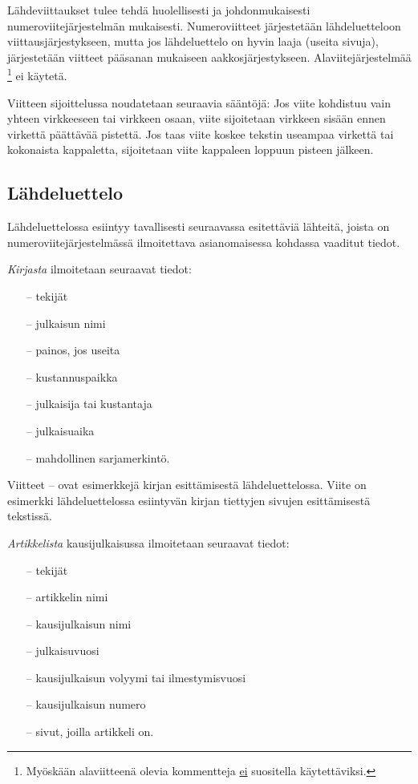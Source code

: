 \documentclass[english,12pt,a4paper,pdftex,elec,utf8]{aaltothesis}
\begin{document}
L\"ahdeviittaukset tulee tehd\"a huolellisesti ja johdonmukaisesti
numeroviitej\"arjestelm\"an mukaisesti. Numeroviitteet j\"arjestet\"a\"an
l\"ahdeluetteloon viittausj\"arjestykseen, mutta jos l\"ahdeluettelo
on hyvin laaja (useita sivuja), j\"arjestet\"a\"an viitteet p\"a\"asanan
mukaiseen aakkosj\"arjestykseen. Alaviitej\"arjestelm\"a\"a
\footnote{My\"osk\"a\"an alaviitteen\"a olevia kommentteja \underline{ei} suositella
k\"aytett\"aviksi.} ei k\"aytet\"a.

Viitteen sijoittelussa noudatetaan seuraavia s\"a\"ant\"oj\"a:
Jos viite kohdistuu vain yhteen virkkeeseen tai virkkeen
osaan, viite \cite{Kauranen} sijoitetaan virkkeen sis\"a\"an ennen virkett\"a
p\"a\"att\"av\"a\"a pistett\"a. Jos taas viite koskee tekstin useampaa
virkett\"a tai kokonaista kappaletta, sijoitetaan viite kappaleen loppuun
pisteen j\"alkeen. \cite{Kauranen}

\subsection*{L\"ahdeluettelo}

L\"ahdeluettelossa esiintyy tavallisesti seuraavassa esitett\"avi\"a
l\"ahteit\"a, joista on numeroviitej\"arjestelm\"ass\"a ilmoitettava
asianomaisessa kohdassa vaaditut tiedot.

\textit{Kirjasta} ilmoitetaan seuraavat tiedot:

\begin{itemize}
\item[--]tekij\"at
\item[--]julkaisun nimi
\item[--]painos, jos useita
\item[--]kustannuspaikka
\item[--]julkaisija tai kustantaja
\item[--]julkaisuaika
\item[--]mahdollinen sarjamerkint\"o.
\end{itemize}

Viitteet \cite{Kauranen}--\cite{Koblitz} ovat esimerkkej\"a kirjan
esitt\"amisest\"a l\"ahdeluettelossa. Viite \cite[s.\ 83--124]{Koblitz} on
esimerkki l\"ahdeluettelossa esiintyv\"an kirjan tiettyjen sivujen
esitt\"amisest\"a tekstiss\"a.

\textit{Artikkelista} kausijulkaisussa ilmoitetaan seuraavat tiedot:

\begin{itemize}

\item[--]tekij\"at
\item[--]artikkelin nimi
\item[--]kausijulkaisun nimi
\item[--]julkaisuvuosi
\item[--]kausijulkaisun volyymi tai ilmestymisvuosi
\item[--]kausijulkaisun numero
\item[--]sivut, joilla artikkeli on.
\end{itemize}
\end{document}
